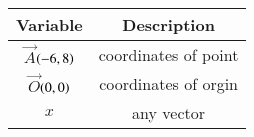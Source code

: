 \begin{tabular}[12pt]{ |c| c|}
    \hline
        \textbf{Variable}  & \textbf{Description}\\
    \hline
        $\vec{A}$$\left(-6,8\right)$ &  coordinates of point\\
    \hline 
        $\vec{O}$$\left(0,0\right)$ & coordinates of orgin\\
    \hline
	$x$ & any vector\\
    \hline 
\end{tabular}
